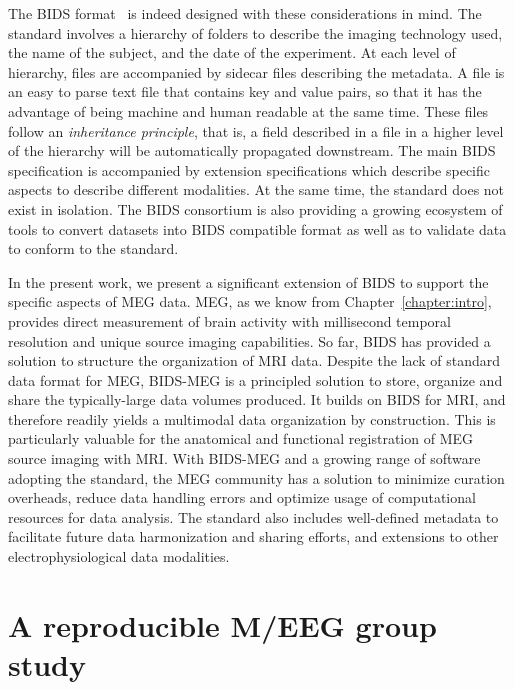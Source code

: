 The \ac{BIDS} format~\citep{gorgolewski2016brain} is indeed designed with these considerations in mind. 
The standard involves a hierarchy of folders to describe the imaging technology used, the name of the subject, and the date of the experiment. 
At each level of hierarchy, files are accompanied by sidecar  files describing the metadata. 
A  file is an easy to parse text file that contains key and value pairs, so that it has the advantage of being machine and human readable at the same time. 
These files follow an \emph{inheritance principle}, that is, a field described in a  file in a higher level of the hierarchy will be automatically propagated downstream. 
The main BIDS specification is accompanied by extension specifications which describe specific aspects to describe different modalities.
At the same time, the standard does not exist in isolation.
The \ac{BIDS} consortium is also providing a growing ecosystem of tools to convert datasets into \ac{BIDS} compatible format as well as to validate data to conform to the standard. 

In the present work, we present a significant extension of \ac{BIDS} to support the specific aspects of \ac{MEG} data. \Ac{MEG}, as we know from Chapter~\ref{chapter:intro}, provides direct measurement of brain activity with millisecond temporal resolution and unique source imaging capabilities. So far, \ac{BIDS} has provided a solution to structure the organization of \ac{MRI} data. Despite the lack of standard data format for \ac{MEG}, BIDS-MEG is a principled solution to store, organize and share the typically-large data volumes produced. It builds on \ac{BIDS} for \ac{MRI}, and therefore readily yields a multimodal data organization by construction. This is particularly valuable for the anatomical and functional registration of \ac{MEG} source imaging with \ac{MRI}. With BIDS-MEG and a growing range of software adopting the standard, the \ac{MEG} community has a solution to minimize curation overheads, reduce data handling errors and optimize usage of computational resources for data analysis. The standard also includes well-defined metadata to facilitate future data harmonization and sharing efforts, and extensions to other electrophysiological data modalities.

\clearpage
\section{A reproducible M/EEG group study}

